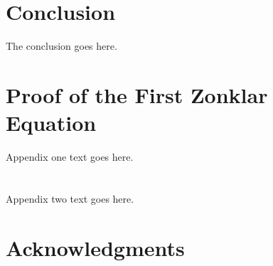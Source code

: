 \documentclass[10pt,journal,compsoc]{IEEEtran}
\begin{document}
\section{Conclusion}
The conclusion goes here.






%


\appendices
\section{Proof of the First Zonklar Equation}
Appendix one text goes here.

\section{}
Appendix two text goes here.


\ifCLASSOPTIONcompsoc
  \section*{Acknowledgments}
\else
\end{document}
